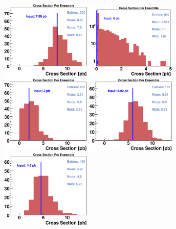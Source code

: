\vspace{0.1in}
\begin{figure}[!h!tbp]
\includegraphics[width=0.40\textwidth]{figures/ensembles/EnsemblesA}
\includegraphics[width=0.40\textwidth]{figures/ensembles/Ensembles0sig1}
\includegraphics[width=0.40\textwidth]{figures/ensembles/EnsemblesC}
\includegraphics[width=0.40\textwidth]{figures/ensembles/EnsemblesD}
\includegraphics[width=0.40\textwidth]{figures/ensembles/Ensembles4.5.eps}

\end{figure}
